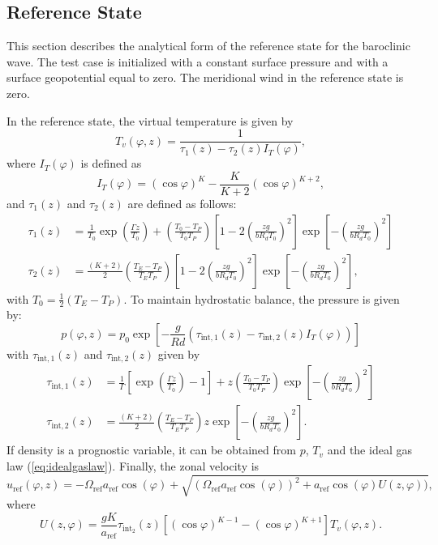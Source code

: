 \documentclass[times,doublespace]{fldauth}
\begin{document}
\begin{table}[h]
\end{table}

\subsection{Reference State}

This section describes the analytical form of the reference state for the baroclinic wave.  The test case is initialized with a constant surface pressure and with a surface geopotential equal to zero.  The meridional wind in the reference state is zero.

In the reference state, the virtual temperature is given by
\begin{equation}
T_v(\varphi, z) = \frac{1}{\tau_1(z)-\tau_2(z) I_T(\varphi)},
\label{virtTemp}
\end{equation} where $I_T(\varphi)$ is defined as
\begin{equation}
I_{T}(\varphi) =(\cos \varphi )^K-\frac{K}{K+2}(\cos \varphi )^{K+2},
\end{equation} and $\tau_1(z)$ and $\tau_2(z)$ are defined as follows:
\begin{align}
\tau_1(z) &= \frac{1}{T_0} \exp\left(\frac{\Gamma z}{T_0}\right) + \left( \frac{T_0-T_P}{T_0T_P} \right)\left[1-2\left(\frac{z g}{b R_d T_0}\right)^2\right] \exp\left[-\left(\frac{z g}{b R_d T_0}\right)^2\right] \\
\tau_2(z) &= \frac{(K + 2)}{2} \left( \frac{T_E-T_P}{T_E T_P} \right) \left[1-2\left(\frac{z g}{b R_d T_0}\right)^2\right] \exp\left[-\left(\frac{z g}{b R_d T_0}\right)^2\right],
\end{align} with $T_0 = \tfrac{1}{2} (T_E - T_P)$.  To maintain hydrostatic balance, the pressure is given by:
\begin{equation}
p(\varphi, z) = p_0\exp \left[ -\frac{g}{Rd}(\tau_{\text{int},1}(z) -\tau_{\text{int},2}(z) I_T(\varphi) ) \right]
\end{equation} with $\tau_{\text{int},1}(z)$ and $\tau_{\text{int},2}(z)$ given by
\begin{align}
\tau_{\text{int},1}(z) &=\frac{1}{\Gamma} \left[ \exp\left( \frac{\Gamma z}{T_0} \right)-1 \right] + z \left(\frac{T_0-T_P}{T_0T_P} \right) \exp\left[-\left(\frac{z g}{b R_d T_0}\right)^2\right] \\
\tau_{\text{int},2}(z) &=\frac{(K+2)}{2} \left(\frac{T_E-T_P}{T_E T_P} \right) z \exp\left[-\left(\frac{z g}{b R_d T_0}\right)^2\right].
\end{align}  If density is a prognostic variable, it can be obtained from $p$, $T_v$ and the ideal gas law (\ref{eq:idealgaslaw}).  Finally, the zonal velocity is
\begin{equation}
u_{\text{ref}}(\varphi, z) = -\Omega_{\text{ref}} a_{\text{ref}} \cos(\varphi)+\sqrt{(\Omega_{\text{ref}} a_{\text{ref}} \cos(\varphi))^2+ a_{\text{ref}} \cos(\varphi)U(z,\varphi))},
\end{equation} where
\begin{equation}
U(z, \varphi) = \frac{g K}{a_{\text{ref}}} \tau_{\text{int}_2}(z) \left[ (\cos \varphi)^{K - 1} - (\cos \varphi)^{K + 1} \right] T_v(\varphi, z).
\end{equation} 
\end{document}
